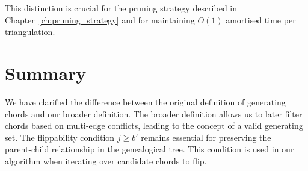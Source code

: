 This distinction is crucial for the pruning strategy described in Chapter~\ref{ch:pruning_strategy} and for maintaining \(O(1)\) amortised time per triangulation.

\section{Summary}
\label{sec:gs_summary}

We have clarified the difference between the original definition of generating chords and our broader definition. 
The broader definition allows us to later filter chords based on multi‑edge conflicts, leading to the concept of a valid generating set. 
The flippability condition \(j \ge b'\) remains essential for preserving the parent‑child relationship in the genealogical tree. 
This condition is used in our algorithm when iterating over candidate chords to flip.